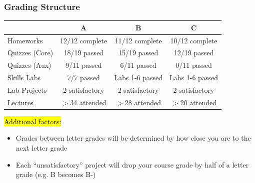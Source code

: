 \documentclass[slidestop,compress,mathserif]{beamer}
\begin{document}
\begin{frame}
	\frametitle{Grading Structure}
	\begin{table}[ht]
	\centering
	\small
	\begin{tabular}{|l|c|c|c|}
	\hline
	 & \textbf{A} & \textbf{B} & \textbf{C} \\
	\hline
	Homeworks & 12/12 complete & 11/12 complete & 10/12 complete \\
	\hline
	Quizzes (Core) & 18/19 passed & 15/19 passed & 12/19 passed \\
	\hline
	Quizzes (Aux) & 9/11 passed & 6/11 passed & 0/11 passed \\
	\hline
	Skills Labs & 7/7 passed & Labs 1-6 passed & Labs 1-6 passed \\
	\hline
	Lab Projects & 2 satisfactory & 2 satisfactory & 2 satisfactory \\
	\hline
	Lectures & $>$34 attended & $>$28 attended & $>$20 attended \\
	\hline
	\end{tabular}
	\end{table}

	\hl{Additional factors:}
	\begin{itemize}
		\item Grades between letter grades will be determined by how close you are to the next letter grade
		\item Each ``unsatisfactory'' project will drop your course grade by half of a letter grade (e.g. B becomes B-)
	\end{itemize}
\end{frame}

\end{document}
